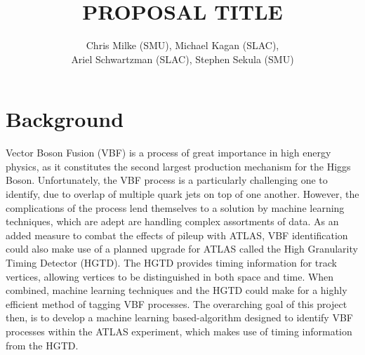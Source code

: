 \documentclass[12pt,letterpaper]{article}
\begin{document}
\pagestyle{fancy}


\pagestyle{plain}
\label{sec:coverpaqe}




\title{{\large PROPOSAL TITLE}}

\author{Chris Milke (SMU), Michael Kagan (SLAC),\\
  Ariel Schwartzman (SLAC), Stephen Sekula (SMU)}


\date{}

\maketitle

\newpage


\section*{Background}
    Vector Boson Fusion (VBF) is a process of great importance in high energy physics, as it constitutes the second largest production mechanism for the Higgs Boson\cite{deFlorian:2016spz}. Unfortunately, the VBF process is a particularly challenging one to identify, due to overlap of multiple quark jets on top of one another. However, the complications of the process lend themselves to a solution by machine learning techniques, which are adept are handling complex assortments of data. As an added measure to combat the effects of pileup with ATLAS, VBF identification could also make use of a planned upgrade for ATLAS called the High Granularity Timing Detector (HGTD). The HGTD provides timing information for track vertices, allowing vertices to be distinguished in both space and time. When combined, machine learning techniques and the HGTD could make for a highly efficient method of tagging VBF processes. The overarching goal of this project then, is to develop a machine learning based-algorithm designed to identify VBF processes within the ATLAS experiment, which makes use of timing information from the HGTD.



\end{document}
